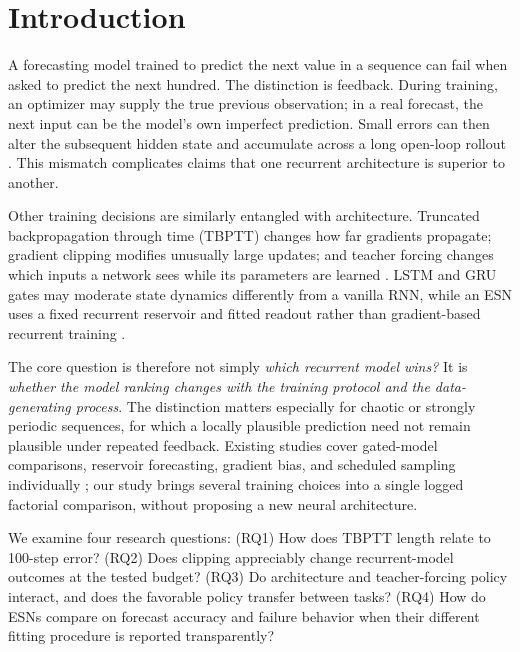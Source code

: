 \documentclass[final,5p,times,twocolumn]{elsarticle}
\begin{document}
\section{Introduction}

A forecasting model trained to predict the next value in a sequence can fail when asked to predict the next hundred. The distinction is feedback. During training, an optimizer may supply the true previous observation; in a real forecast, the next input can be the model's own imperfect prediction. Small errors can then alter the subsequent hidden state and accumulate across a long open-loop rollout \cite{bengio2015scheduled,vlachas2024learning}. This mismatch complicates claims that one recurrent architecture is superior to another.

Other training decisions are similarly entangled with architecture. Truncated backpropagation through time (TBPTT) changes how far gradients propagate; gradient clipping modifies unusually large updates; and teacher forcing changes which inputs a network sees while its parameters are learned \cite{pascanu2013difficulty,aicher2020adaptively}. LSTM and GRU gates may moderate state dynamics differently from a vanilla RNN, while an ESN uses a fixed recurrent reservoir and fitted readout rather than gradient-based recurrent training \cite{hochreiter1997long,cho2014learning,lukosevicius2012practical}.

The core question is therefore not simply \emph{which recurrent model wins?} It is \emph{whether the model ranking changes with the training protocol and the data-generating process}. The distinction matters especially for chaotic or strongly periodic sequences, for which a locally plausible prediction need not remain plausible under repeated feedback. Existing studies cover gated-model comparisons, reservoir forecasting, gradient bias, and scheduled sampling individually \cite{greff2017lstm,shahi2022prediction,aicher2020adaptively,bengio2015scheduled}; our study brings several training choices into a single logged factorial comparison, without proposing a new neural architecture.

We examine four research questions: (RQ1) How does TBPTT length relate to 100-step error? (RQ2) Does clipping appreciably change recurrent-model outcomes at the tested budget? (RQ3) Do architecture and teacher-forcing policy interact, and does the favorable policy transfer between tasks? (RQ4) How do ESNs compare on forecast accuracy and failure behavior when their different fitting procedure is reported transparently?
\end{document}
